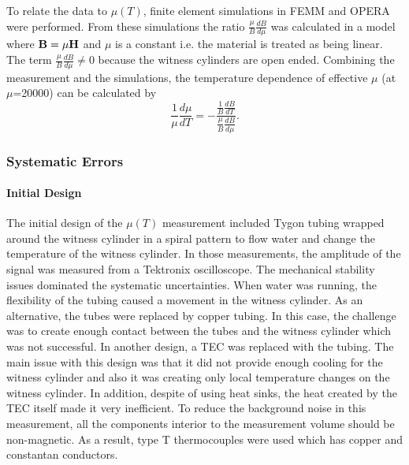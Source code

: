 \documentclass[review]{elsarticle}
\begin{document}
To relate the data to $\mu(T)$, finite element simulations in FEMM and
OPERA were performed.  From these simulations the ratio $\frac{\mu}{B}
\frac{dB}{d\mu}$ was calculated in a model where $\bold{B}=\mu
\bold{H}$ and $\mu$ is a constant i.e. the material is treated as
being linear. The term $\frac{\mu}{B}\frac{dB}{d\mu}\neq 0$ because
the witness cylinders are open ended. Combining the measurement and
the simulations, the temperature dependence of effective $\mu$ (at
$\mu$=20000) can be calculated by
\begin{equation}
\frac{1}{\mu}\frac{d\mu}{dT}= -\frac{\frac{1}{B}\frac{dB}{dT}}{\frac{\mu}{B}\frac{dB}{d\mu}}.
\end{equation}

\subsubsection{Systematic Errors}

\paragraph{Initial Design}

The initial design of the $\mu(T)$ measurement included Tygon tubing
wrapped around the witness cylinder in a spiral pattern to flow water
and change the temperature of the witness cylinder. In those
measurements, the amplitude of the signal was measured from a
Tektronix oscilloscope. The mechanical stability issues dominated the
systematic uncertainties. When water was running, the flexibility of
the tubing caused a movement in the witness cylinder. As an
alternative, the tubes were replaced by copper tubing. In this case,
the challenge was to create enough contact between the tubes and the
witness cylinder which was not successful. In another design, a TEC
was replaced with the tubing. The main issue with this design was that
it did not provide enough cooling for the witness cylinder and also it
was creating only local temperature changes on the witness
cylinder. In addition, despite of using heat sinks, the heat created
by the TEC itself made it very inefficient. To reduce the background
noise in this measurement, all the components interior to the
measurement volume should be non-magnetic. As a result, type T
thermocouples were used which has copper and constantan conductors.


\end{document}
